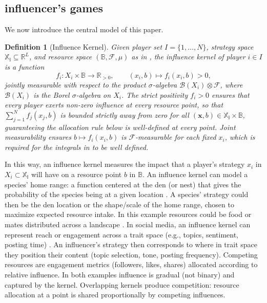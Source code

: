 \documentclass{article}
\newtheorem{definition}{Definition}
\begin{document}
            \subsection{influencer's games}\label{subsec:SI_model}
                We now introduce the central model of this paper.
                \begin{definition}[Influence Kernel]\label{def:SI_influence_kernel}
                    Given player set $I = \{1,\dots,N\}$, strategy space $\mathbb{X_i}\subseteq\mathbb{R}^L$, and resource space $(\mathbb{B},\mathcal{F},\mu)$ as in , the influence kernel of player $i\in I$ is a function
                    \begin{equation}\label{eq:SI_influence_kernel_def}
                        f_i : X_i \times \mathbb{B} \to \mathbb{R}_{>0},
                        \qquad (x_i,b) \mapsto f_i(x_i,b) > 0,
                    \end{equation}
                    jointly measurable with respect to the product $\sigma$-algebra $\mathcal{B}(X_i)\otimes\mathcal{F}$, where $\mathcal{B}(X_i)$ is the Borel $\sigma$-algebra on $X_i$. The strict positivity $f_i > 0$ ensures that every player exerts non-zero influence at every resource point, so that $\sum_{j=1}^N f_j(x_j,b)$ is bounded strictly away from zero for all $(\mathbf{x},b)\in\mathbb{X_i}\times\mathbb{B}$, guaranteeing the allocation rule below is well-defined at every point. Joint measurability ensures $b\mapsto f_i(x_i,b)$ is $\mathcal{F}$-measurable for each fixed $x_i$, which is required for the integrals in  to be well defined.
                \end{definition}
                In this way, an influence kernel measures the impact that a player's strategy $x_i$ in $X_i \subset \mathbb{X_i}$ will have on a resource point $b$ in $\mathbb{B}$. An influence kernel can model a species' home range: a function centered at the den (or nest) that gives the probability of the species being at a given location \cite{worton1989kernel,powell2000animal}. A species' strategy could then be the den location or the shape/scale of the home range, chosen to maximize expected resource intake. In this example resources could be food or mates distributed across a landscape \cite{borger2008there}. In social media, an influence kernel can represent reach or engagement across a trait space (e.g., topics, sentiment, posting time) \cite{lee2018advertising,huang2021strategic}. An influencer's strategy then corresponds to where in trait space they position their content (topic selection, tone, posting frequency). Competing resources are engagement metrics (followers, likes, shares) allocated according to relative influence. In both examples influence is gradual (not binary) and captured by the kernel. Overlapping kernels produce competition: resource allocation at a point is shared proportionally by competing influences. 
                
\end{document}
